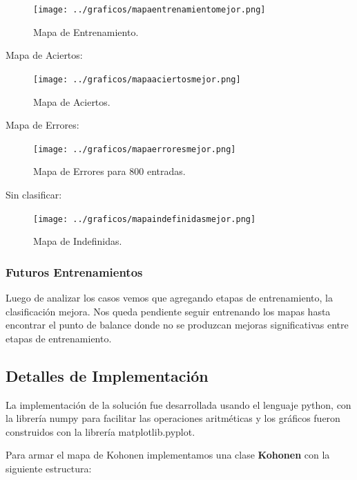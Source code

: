 \begin{figure}[H]
  \centering
  \texttt{[image: ../graficos/mapaentrenamientomejor.png]}
  \caption{Mapa de Entrenamiento.}
  \label{fig:mapa train}
\end{figure}


Mapa de Aciertos:

\begin{figure}[H]
  \centering
  \texttt{[image: ../graficos/mapaaciertosmejor.png]}
  \caption{Mapa de Aciertos.}
  \label{fig:mapa aciertos}
\end{figure}

Mapa de Errores:


\begin{figure}[H]
  \centering
  \texttt{[image: ../graficos/mapaerroresmejor.png]}
  \caption{Mapa de Errores para 800 entradas.}
  \label{fig:mapa errores 800}
\end{figure}

Sin clasificar:


\begin{figure}[H]
  \centering
  \texttt{[image: ../graficos/mapaindefinidasmejor.png]}
  \caption{Mapa de Indefinidas.}
  \label{fig:mapa indefinidas}
\end{figure}


\subsubsection{Futuros Entrenamientos}

Luego de analizar los casos vemos que agregando etapas de entrenamiento, la clasificación mejora.
Nos queda pendiente seguir entrenando los mapas hasta encontrar el punto de balance donde no se
produzcan mejoras significativas entre etapas de entrenamiento.


\subsection{Detalles de Implementación}

La implementación de la solución fue desarrollada usando el lenguaje python,
con la librería numpy para facilitar las operaciones aritméticas y los gráficos
fueron construidos con la librería matplotlib.pyplot.

Para armar el mapa de Kohonen implementamos una clase \textbf{Kohonen} con la siguiente estructura:

